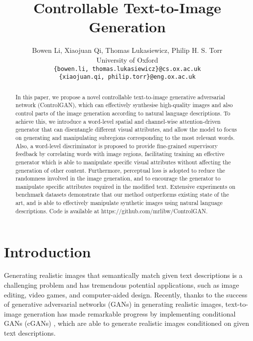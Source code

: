 \documentclass{article}
\title{Controllable Text-to-Image Generation}
\author{Bowen Li,  Xiaojuan Qi, Thomas Lukasiewicz, Philip H. S. Torr\\
  University of Oxford\\
  \texttt{\{bowen.li, thomas.lukasiewicz\}@cs.ox.ac.uk} \\
  \texttt{\{xiaojuan.qi, philip.torr\}@eng.ox.ac.uk}
}
\begin{document}
\maketitle

\begin{abstract}

In this paper, we propose a novel controllable text-to-image generative adversarial network (ControlGAN), which can effectively synthesise high-quality images and {also control parts of the image generation} according to natural language descriptions. To achieve this, we introduce a word-level spatial and channel-wise attention-driven generator that can disentangle different visual attributes, and allow the model to focus on generating and manipulating subregions corresponding to the most relevant words. Also, a word-level discriminator is proposed to provide fine-grained supervisory feedback by correlating words with image regions, facilitating training an effective generator which is able to manipulate specific visual attributes without affecting the generation of other content. Furthermore, perceptual loss is adopted to reduce the randomness involved in the image generation, and to encourage the generator to manipulate specific attributes required in the modified text. Extensive experiments on benchmark datasets demonstrate that our method outperforms existing state of the art, and is able to effectively manipulate synthetic images using natural language descriptions. Code is available at \textcolor{colour}{https://github.com/mrlibw/ControlGAN}.
\end{abstract}

\section{Introduction}
\label{intro}
Generating realistic images that semantically match given text descriptions is a challenging problem and has tremendous potential applications, such as image editing, video games, and computer-aided design. Recently, thanks to the success of generative adversarial networks (GANs) \cite{denton2015deep, goodfellow2014generative, radford2015unsupervised} in generating realistic images, text-to-image generation has made remarkable progress \cite{reed2016generative, xu2018attngan, zhang2017stackgan} by implementing conditional GANs (cGANs) \cite{dong2017semantic, reed2016generative, reed2016learning}, which are able to generate realistic images conditioned on given text descriptions.
\end{document}
